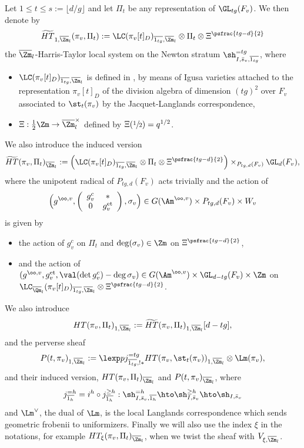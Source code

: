 \begin{notas}
Let $1 \leq t \leq s:=\lfloor d/g \rfloor$ and let $\Pi_t$ be any representation of
$\GL_{tg}(F_v)$. We then denote by
\[
\widetilde{HT}_{1,\overline \Zm_l}(\pi_v,\Pi_t):=\LC(\pi_v[t]_D)_{\overline{1_{tg}},\overline \Zm_l}
\otimes \Pi_t \otimes \Xi^{\psfrac{tg-d}{2}}
\]
the $\overline \Zm_l$-Harris-Taylor local system on the Newton stratum
$\sh^{=tg}_{I,\bar s_v,\overline{1_{tg}}}$, where
\begin{itemize}
\item $\LC(\pi_v[t]_D)_{\overline{1_{tg}},\overline \Zm_l}$ is defined in \cite[\S IV-1]{h-t}, by means of
Igusa varieties attached to the representation $\pi_v[t]_D$ of the division
algebra of dimension
$(tg)^2$ over $F_v$ associated to $\st_t(\pi_v)$ by the Jacquet-Langlands correspondence,

\item $\Xi:\frac{1}{2} \Zm \to \overline \Zm_l^\times$ defined by $\Xi(\sfrac{1}{2})=q^{1/2}$.
\end{itemize}
We also introduce the induced version
\[
\widetilde{HT}(\pi_v,\Pi_t)_{\overline \Zm_l}:=
\Bigl (\LC(\pi_v[t]_D)_{\overline{1_{tg}},\overline \Zm_l}
\otimes \Pi_t \otimes \Xi^{\psfrac{tg-d}{2}} \Bigr) \times_{P_{tg,d}(F_v)} \GL_d(F_v),
\]
where the unipotent radical of $P_{tg,d}(F_v)$ acts trivially and the action of
\[
\Bigl(g^{\oo,v},\left (\begin{array}{cc} g_v^c & * \\ 0 & g_v^\mathrm{et} \end{array} \right),\sigma_v\Bigr)
\in G(\Am^{\oo,v}) \times P_{tg,d}(F_v) \times W_v
\]
is given by
\begin{itemize}
\item the action of $g_v^c$ on $\Pi_t$ and
$\deg(\sigma_v) \in \Zm$ on $ \Xi^{\psfrac{tg-d}{2}}$,

\item and the action of $(g^{\oo,v},g_v^\mathrm{et},\val(\det g_v^c)-\deg \sigma_v)
\in G(\Am^{\oo,v}) \times \GL_{d-tg}(F_v) \times \Zm$ on $\LC_{\overline \Qm_l}
(\pi_v[t]_D)_{\overline{1_{tg}},\overline \Zm_l} \otimes \Xi^{\psfrac{tg-d}{2}}$.
\end{itemize}
We also introduce
\[
HT(\pi_v,\Pi_t)_{1,\overline \Zm_l}:=\widetilde{HT}(\pi_v,\Pi_t)_{1,\overline \Zm_l}
[d-tg],
\]
and the perverse sheaf
\[
P(t,\pi_v)_{1,\overline \Zm_l}:=\lexp p j^{=tg}_{\overline{1_{tg}},!*} HT(\pi_v,\st_t(\pi_v))_{1,\overline \Zm_l}
\otimes \Lm(\pi_v),
\]
and their induced version, $HT(\pi_v,\Pi_t)_{\overline \Zm_l}$ and $P(t,\pi_v)_{\overline \Zm_l}$, where
\[
j^{=h}_{\overline{1_h}}=i^h \circ j^{\geq h}_{\overline{1_h}}:\sh^{=h}_{I,\bar s_v,\overline{1_h}} \hto
\sh^{\geq h}_{I,\bar s_v} \hto \sh_{I,\bar s_v}
\]
and $\Lm^\vee$, the dual of $\Lm$, is the local Langlands correspondence
which sends geometric frobenii to uniformizers.
Finally we will also use the index $\xi$ in the notations, for example
$HT_\xi(\pi_v,\Pi_t)_{\overline \Zm_l}$,
when we twist the sheaf with $V_{\xi,\overline \Zm_l}$.
\end{notas}

